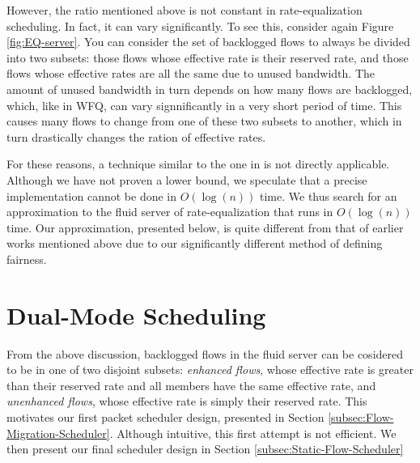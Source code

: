 \documentclass[conference]{IEEEtran}
\begin{document}
However, the ratio mentioned above is not constant in rate-equalization 
scheduling. In fact, it can vary significantly.  To see this, consider again 
Figure \ref{fig:EQ-server}. You can consider the set of backlogged flows to 
always be divided into two subsets: those flows whose effective rate is their 
reserved rate, and those flows whose effective rates are all the same due to 
unused bandwidth. The amount of unused bandwidth in turn depends on how many 
flows are backlogged, which, like in WFQ, can vary signnificantly in a very 
short period of time. This causes many flows to change from one of these two 
subsets to another, which in turn drastically changes the ration of effective 
rates.

For these reasons, a technique similar to the one in \cite{WFQlogN} is not 
directly applicable. Although we have not proven a lower bound, we speculate 
that a precise implementation cannot be done in $O(\log(n))$ time. We thus 
search for an approximation to the fluid server of rate-equalization that runs 
in $O(\log(n))$ time. Our approximation, presented below, is quite different 
from that of earlier works mentioned above due to our significantly different 
method of defining fairness.  

%
%
%
%
%
%
%
%
%
%
%
%

%
\section{Dual-Mode Scheduling}

From the above discussion, backlogged flows in the fluid server can be 
cosidered to be in one of two disjoint subsets: {\em enhanced flows}, whose 
effective rate is greater than their reserved rate and all members have the 
same effective rate, and {\em unenhanced flows}, whose effective rate is simply 
their reserved rate. This motivates our first packet scheduler design, 
presented in Section \ref{subsec:Flow-Migration-Scheduler}.  Although 
intuitive, this first attempt is not efficient.  We then present our final 
scheduler design in Section \ref{subsec:Static-Flow-Scheduler} 
\end{document}
